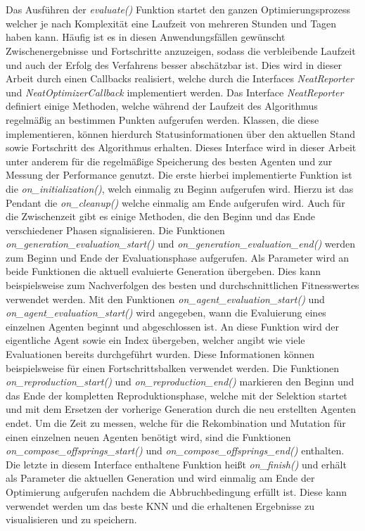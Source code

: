 \\\\
Das Ausführen der \emph{evaluate()} Funktion startet den ganzen Optimierungsprozess welcher je nach Komplexität eine Laufzeit von mehreren Stunden und Tagen haben kann. Häufig ist es in diesen Anwendungsfällen gewünscht Zwischenergebnisse und Fortschritte anzuzeigen, sodass die verbleibende Laufzeit und auch der Erfolg des Verfahrens besser abschätzbar ist. Dies wird in dieser Arbeit durch einen Callbacks realisiert, welche durch die Interfaces \emph{NeatReporter} und \emph{NeatOptimizerCallback} implementiert werden. Das Interface \emph{NeatReporter} definiert einige Methoden, welche während der Laufzeit des Algorithmus regelmäßig an bestimmen Punkten aufgerufen werden. Klassen, die diese implementieren, können hierdurch Statusinformationen über den aktuellen Stand sowie Fortschritt des Algorithmus erhalten. Dieses Interface wird in dieser Arbeit unter anderem für die regelmäßige Speicherung des besten Agenten und zur Messung der Performance genutzt. Die erste hierbei implementierte Funktion ist die \emph{on\_initialization()}, welch einmalig zu Beginn aufgerufen wird. Hierzu ist das Pendant die \emph{on\_cleanup()} welche einmalig am Ende aufgerufen wird. Auch für die Zwischenzeit gibt es einige Methoden, die den Beginn und das Ende verschiedener Phasen signalisieren. Die Funktionen \emph{on\_generation\_evaluation\_start()} und \emph{on\_generation\_evaluation\_end()} werden zum Beginn und Ende der Evaluationsphase aufgerufen. Als Parameter wird an beide Funktionen die aktuell evaluierte Generation übergeben. Dies kann beispielsweise zum Nachverfolgen des besten und durchschnittlichen Fitnesswertes verwendet werden. Mit den Funktionen \emph{on\_agent\_evaluation\_start()} und \emph{on\_agent\_evaluation\_start()} wird angegeben, wann die Evaluierung eines einzelnen Agenten beginnt und abgeschlossen ist. An diese Funktion wird der eigentliche Agent sowie ein Index übergeben, welcher angibt wie viele Evaluationen bereits durchgeführt wurden. Diese Informationen können beispielsweise für einen Fortschrittsbalken verwendet werden. Die Funktionen \emph{on\_reproduction\_start()} und \emph{on\_reproduction\_end()} markieren den Beginn und das Ende der kompletten Reproduktionsphase, welche mit der Selektion startet und mit dem Ersetzen der vorherige Generation durch die neu erstellten Agenten endet. Um die Zeit zu messen, welche für die Rekombination und Mutation für einen einzelnen neuen Agenten benötigt wird, sind die Funktionen \emph{on\_compose\_offsprings\_start()} und  \emph{on\_compose\_offsprings\_end()} enthalten. Die letzte in diesem Interface enthaltene Funktion heißt \emph{on\_finish()} und erhält als Parameter die aktuellen Generation und wird einmalig am Ende der Optimierung aufgerufen nachdem die Abbruchbedingung erfüllt ist. Diese kann verwendet werden um das beste \ac{KNN} und die erhaltenen Ergebnisse zu visualisieren und zu speichern.
